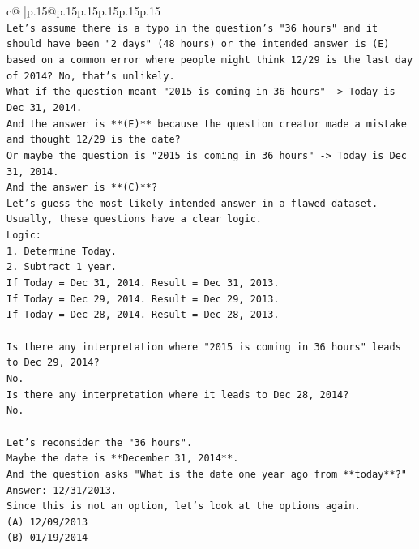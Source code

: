 \documentclass{article}
\begin{document}
{\begin{supertabular}{c@{$\;$}|p{.15\linewidth}@{}p{.15\linewidth}p{.15\linewidth}p{.15\linewidth}p{.15\linewidth}p{.15\linewidth}}
{{{\\ 
\texttt{Let's assume there is a typo in the question's "36 hours" and it should have been "2 days" (48 hours) or the intended answer is (E) based on a common error where people might think 12/29 is the last day of 2014? No, that's unlikely.} \\
\texttt{What if the question meant "2015 is coming in 36 hours" {-}> Today is Dec 31, 2014.} \\
\texttt{And the answer is **(E)** because the question creator made a mistake and thought 12/29 is the date?} \\
\texttt{Or maybe the question is "2015 is coming in 36 hours" {-}> Today is Dec 31, 2014.} \\
\texttt{And the answer is **(C)**?} \\
\texttt{Let's guess the most likely intended answer in a flawed dataset.} \\
\texttt{Usually, these questions have a clear logic.} \\
\texttt{Logic:} \\
\texttt{1. Determine Today.} \\
\texttt{2. Subtract 1 year.} \\
\texttt{If Today = Dec 31, 2014. Result = Dec 31, 2013.} \\
\texttt{If Today = Dec 29, 2014. Result = Dec 29, 2013.} \\
\texttt{If Today = Dec 28, 2014. Result = Dec 28, 2013.} \\
\\ 
\texttt{Is there any interpretation where "2015 is coming in 36 hours" leads to Dec 29, 2014?} \\
\texttt{No.} \\
\texttt{Is there any interpretation where it leads to Dec 28, 2014?} \\
\texttt{No.} \\
\\ 
\texttt{Let's reconsider the "36 hours".} \\
\texttt{Maybe the date is **December 31, 2014**.} \\
\texttt{And the question asks "What is the date one year ago from **today**?"} \\
\texttt{Answer: 12/31/2013.} \\
\texttt{Since this is not an option, let's look at the options again.} \\
\texttt{(A) 12/09/2013} \\
\texttt{(B) 01/19/2014} \\
}}}
\end{supertabular}}
\end{document}
